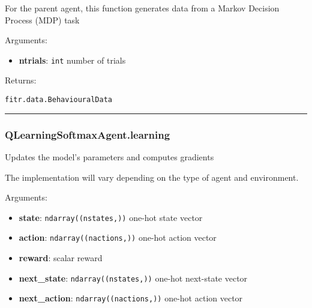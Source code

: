 \begin{Shaded}
\begin{Highlighting}[]
\end{Highlighting}
\end{Shaded}

For the parent agent, this function generates data from a Markov
Decision Process (MDP) task

Arguments:

\begin{itemize}
\tightlist
\item
  \textbf{ntrials}: \texttt{int} number of trials
\end{itemize}

Returns:

\texttt{fitr.data.BehaviouralData}

\begin{center}\rule{0.5\linewidth}{\linethickness}\end{center}

\subsubsection{QLearningSoftmaxAgent.learning}\label{qlearningsoftmaxagent.learning}

\begin{Shaded}
\begin{Highlighting}[]
\end{Highlighting}
\end{Shaded}

Updates the model's parameters and computes gradients

The implementation will vary depending on the type of agent and
environment.

Arguments:

\begin{itemize}
\tightlist
\item
  \textbf{state}: \texttt{ndarray((nstates,))} one-hot state vector
\item
  \textbf{action}: \texttt{ndarray((nactions,))} one-hot action vector
\item
  \textbf{reward}: scalar reward
\item
  \textbf{next\_state}: \texttt{ndarray((nstates,))} one-hot next-state
  vector
\item
  \textbf{next\_action}: \texttt{ndarray((nactions,))} one-hot action
  vector
\end{itemize}

